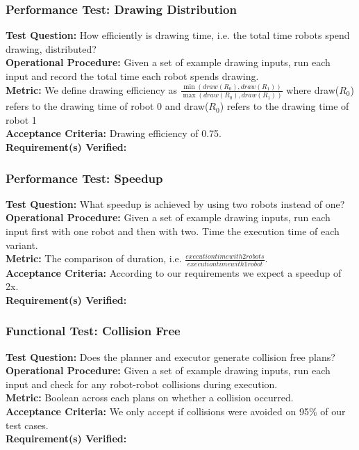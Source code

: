 \subsubsection{Performance Test: Drawing Distribution}
\label{sec:sdp_pt_draw}
\textbf{Test Question:} How efficiently is drawing time, i.e. the total time robots spend drawing, distributed? \\
\textbf{Operational Procedure:}  Given a set of example drawing inputs, run each input and record the total time each robot spends drawing. \\
\textbf{Metric:} We define drawing efficiency as $\frac{\min(draw(R_{0}), draw(R_{1}))}{\max(draw(R_{0}), draw(R_{1}))}$ where draw($R_{0}$) refers to the drawing time of robot 0 and draw($R_{0}$) refers to the drawing time of robot 1\\
\textbf{Acceptance Criteria:} Drawing efficiency of 0.75.\\
\textbf{Requirement(s) Verified:} 

\subsubsection{Performance Test: Speedup}
\label{sec:sdp_pt_speedup}
\textbf{Test Question:} What speedup is achieved by using two robots instead of one?\\
\textbf{Operational Procedure:} Given a set of example drawing inputs, run each input first with one robot and then with two. Time the execution time of each variant.\\
\textbf{Metric:} The comparison of duration, i.e. $\frac{execution time with 2 robots}{execution time with 1 robot}$. \\
\textbf{Acceptance Criteria:} According to our requirements we expect a speedup of 2x. \\
\textbf{Requirement(s) Verified:} 

\subsubsection{Functional Test: Collision Free}
\label{sec:sdp_ft_collision}
\textbf{Test Question:} Does the planner and executor generate collision free plans?\\
\textbf{Operational Procedure:} Given a set of example drawing inputs, run each input and check for any robot-robot collisions during execution. \\
\textbf{Metric:} Boolean across each plans on whether a collision occurred.\\
\textbf{Acceptance Criteria:} We only accept if collisions were avoided on 95\% of our test cases. \\
\textbf{Requirement(s) Verified:} 

